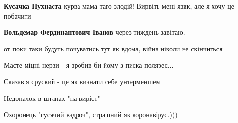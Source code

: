 \begin{itemize}
\begin{itemize}
\textbf{Кусачка Пухнаста} курва мама тато злодій! Вирвіть мені язик, але я хочу це побачити

 
\textbf{Вольдемар Фердинантович Іванов} через тиждень завітаю.
\end{itemize}

 
от поки таки будуть почуватись тут як вдома, війна ніколи не скінчиться

 
Маєте міцні нерви - я зробив би йому з писка полярес...

 
Сказав я сруский - це як визнати себе унтерменшем

 
Недопалок в штанах "на виріст"

 
Охоронець "гусячий вздроч", страшний як коронавірус.)))

 

\end{itemize}
